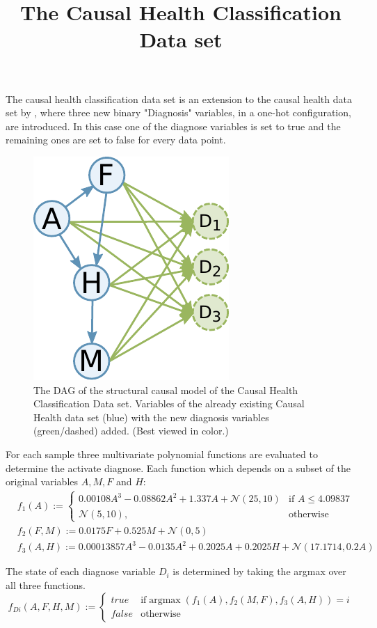 \documentclass{article}
\title{The Causal Health Classification Data set}
\author{}
\date{} %
\DeclareMathOperator*{\argmax}{argmax}
\begin{document}
\maketitle


The causal health classification data set is an extension to the causal health data set by \cite{Zecevic2021a}, where three new binary "Diagnosis" variables, in a one-hot configuration, are introduced. In this case one of the diagnose variables is set to true and the remaining ones are set to false for every data point.

\begin{figure}[h]
\centering
\includegraphics[width=0.2\linewidth]{figure_CHCDAG.pdf}
\caption{The DAG of the structural causal model of the Causal Health Classification Data set. Variables of the already existing Causal Health data set (blue) with the new diagnosis variables (green/dashed) added. (Best viewed in color.)}
\label{SCMCHC}
\end{figure}

For each sample three multivariate polynomial functions are evaluated to determine the activate diagnose. Each function which depends on a subset of the original variables $A, M, F$ and $H$:
\[
\begin{split}
  & f_1(A) :=
  \begin{cases}
    0.00108 A^3 - 0.08862 A^2 + 1.337 A + \mathcal{N}(25, 10) & \text{if } A\leq4.09837\\
     \mathcal{N}(5, 10),              & \text{otherwise}
  \end{cases} \\
  & f_2(F,M) := 0.0175F + 0.525M + \mathcal{N}(0, 5) \\
  & f_3(A,H) := 0.00013857 A^3 - 0.0135 A^2 + 0.2025 A + 0.2025 H + \mathcal{N}(17.1714, 0.2A)
\end{split}
\]

The state of each diagnose variable $D_i$ is determined by taking the argmax over all three functions.
\[
  f_{Di}(A, F, H, M) :=
  \begin{cases}
    \mathit{true} & \text{if} \argmax(f_1(A), f_2(M,F), f_3(A,H)) = i \\
    \mathit{false} & \text{otherwise}
  \end{cases}
\]
\end{document}
